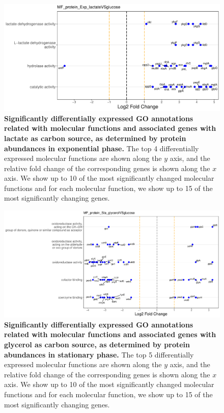 \documentclass[a4paper]{article}
\begin{document}
\begin{figure}[!htb]
	\includegraphics[width=1.0\textwidth]{../../d_figures/MF05_protein_Exp_lactateVSglucose_withTitle.pdf}
	\caption[Significantly differentially expressed GO annotations associated with molecular functions for protein samples in exponential phase tested for lactate against glucose]
	{\textbf{Significantly differentially expressed GO annotations related with molecular functions and associated genes with lactate as carbon source, as determined by protein abundances in exponential phase.} The top 4 differentially expressed molecular functions are shown along the $y$ axis, and the relative fold change of the corresponding genes is shown along the $x$ axis. We show up to 10 of the most significantly changed molecular functions and for each molecular function, we show up to 15 of the most significantly changing genes.}
\end{figure}


\begin{figure}[!htb]
	\includegraphics[width=1.0\textwidth]{../../d_figures/MF06_protein_Sta_glycerolVSglucose_withTitle.pdf}
	\caption[Significantly differentially expressed GO annotations associated with molecular functions for protein samples in stationary phase tested for glycerol against glucose]
	{\textbf{Significantly differentially expressed GO annotations related with molecular functions and associated genes with glycerol as carbon source, as determined by protein abundances in stationary phase.} The top 5 differentially expressed molecular functions are shown along the $y$ axis, and the relative fold change of the corresponding genes is shown along the $x$ axis. We show up to 10 of the most significantly changed molecular functions and for each molecular function, we show up to 15 of the most significantly changing genes.}
\end{figure}
\end{document}
